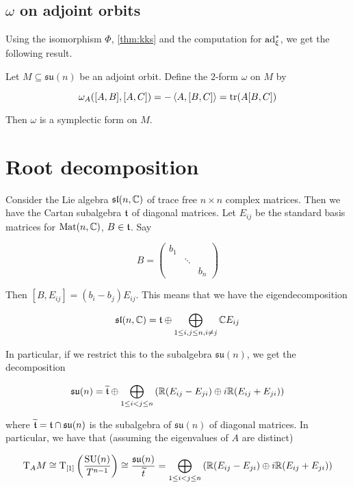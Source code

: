 \documentclass{article}
\DeclareMathOperator{\SU}{SU}
\newcommand{\su}{\mathfrak{su}}
\renewcommand{\sl}{\mathfrak{sl}}
\renewcommand{\tilde}{\widetilde}
\begin{document}
\subsection{\(\omega\) on adjoint orbits}

Using the isomorphism \(\Phi\), \cref{thm:kks} and the computation for \(\operatorname{ad}_\xi^*\), we get the following result.

\begin{theorem}
    Let \(M \subseteq \su(n)\) be an adjoint orbit. Define the \(2\)-form \(\omega\) on \(M\) by

    \[\omega_A([A, B], [A, C]) = -\left\langle A, [B, C] \right\rangle = \tr(A[B, C])\]

    Then \(\omega\) is a symplectic form on \(M\).
\end{theorem}

\section{Root decomposition}

Consider the Lie algebra \(\sl(n, \C)\) of trace free \(n \times n\) complex matrices. Then we have the Cartan subalgebra \(\mathfrak{t}\) of diagonal matrices. Let \(E_{ij}\) be the standard basis matrices for \(\operatorname{Mat}(n, \mathbb{C})\), \(B \in \mathfrak{t}\). Say

\[B = \begin{pmatrix}
    b_1 \\
    & \ddots \\
    & & b_n
\end{pmatrix}\]

Then \([B, E_{ij}] = (b_i - b_j)E_{ij}\). This means that we have the eigendecomposition

\begin{equation}
    \label{eq:sln-root}
    \sl(n, \C) = \mft \oplus \bigoplus_{1 \le i, j \le n, i \ne j} \C E_{ij}
\end{equation}

In particular, if we restrict this to the subalgebra \(\su(n)\), we get the decomposition

\[\su(n) = \tilde\mft \oplus \bigoplus_{1 \le i < j \le n} \left(\R(E_{ij} - E_{ji}) \oplus i\R (E_{ij} + E_{ji})\right)\]

where \(\tilde \mft = \mft \cap \su(n)\) is the subalgebra of \(\su(n)\) of diagonal matrices. In particular, we have that (assuming the eigenvalues of \(A\) are distinct)

\[\T_A M \cong \T_{[1]}\left(\frac{\SU(n)}{T^{n-1}}\right) \cong \frac{\su(n)}{\tilde t} = \bigoplus_{1 \le i < j \le n} \left(\R(E_{ij} - E_{ji}) \oplus i\R (E_{ij} + E_{ji})\right)\]
\end{document}
